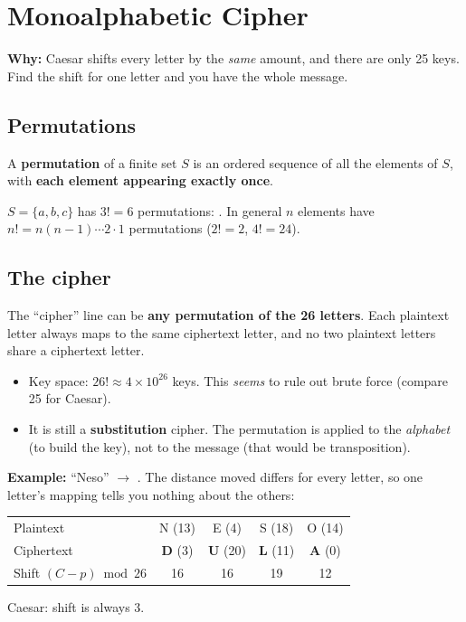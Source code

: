 \newcommand{\NESOACADEMY}{{N,E,S,O,A},{C,D,M,Y,B},{F,G,H,{I/J},K},{L,P,Q,R,T},{U,V,W,X,Z}}
\newcommand{\JUPITER}{{{I/J},U,P,T,E},{R,A,B,C,D},{F,G,H,K,L},{M,N,O,Q,S},{V,W,X,Y,Z}}
\newcommand{\NESOAPP}{{N,E,S,O,A},{P,B,C,D,F},{G,H,{I/J},K,L},{M,Q,R,T,U},{V,W,X,Y,Z}}

\section{Monoalphabetic Cipher}

\textbf{Why:} Caesar shifts every letter by the \emph{same} amount, and there are only 25 keys. Find the shift for one letter and you have the whole message.

\subsection{Permutations}
\begin{keybox}
A \textbf{permutation} of a finite set $S$ is an ordered sequence of all the elements of $S$, with \textbf{each element appearing exactly once}.
\end{keybox}
$S=\{a,b,c\}$ has $3! = 6$ permutations: .\quad
In general $n$ elements have $n! = n(n-1)\cdots 2\cdot 1$ permutations ($2! = 2$, $4! = 24$).

\subsection{The cipher}
\begin{keybox}
The ``cipher'' line can be \textbf{any permutation of the 26 letters}. Each plaintext letter always maps to the same ciphertext letter, and no two plaintext letters share a ciphertext letter.
\end{keybox}
\begin{itemize}
  \item Key space: $26! \approx 4 \times 10^{26}$ keys. This \emph{seems} to rule out brute force (compare 25 for Caesar).
  \item It is still a \textbf{substitution} cipher. The permutation is applied to the \emph{alphabet} (to build the key), not to the message (that would be transposition).
\end{itemize}

\textbf{Example:} ``Neso'' $\to$ . The distance moved differs for every letter, so one letter's mapping tells you nothing about the others:
\begin{center}\small\setlength{\tabcolsep}{6pt}
\begin{tabular}{@{}lcccc@{}}
\toprule
Plaintext & N (13) & E (4) & S (18) & O (14)\\
Ciphertext & \textbf{D} (3) & \textbf{U} (20) & \textbf{L} (11) & \textbf{A} (0)\\
Shift $(C-p) \bmod 26$ & 16 & 16 & 19 & 12\\
\bottomrule
\end{tabular}
\qquad Caesar: shift is always 3.
\end{center}

